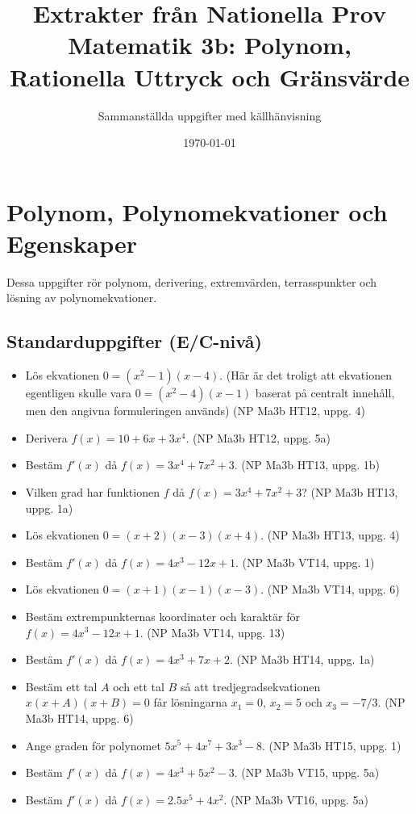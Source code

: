 \documentclass{article}
\title{Extrakter från Nationella Prov Matematik 3b: Polynom, Rationella Uttryck och Gränsvärde}
\author{Sammanställda uppgifter med källhänvisning}
\date{\today}
\begin{document}
\maketitle

\section{Polynom, Polynomekvationer och Egenskaper}

Dessa uppgifter rör polynom, derivering, extremvärden, terrasspunkter och lösning av polynomekvationer.

\subsection{Standarduppgifter (E/C-nivå)}
\begin{itemize}
    \item Lös ekvationen $0 = (x^2-1)(x-4)$. (Här är det troligt att ekvationen egentligen skulle vara $0 = (x^2-4)(x-1)$ baserat på centralt innehåll, men den angivna formuleringen används) (NP Ma3b HT12, uppg. 4)
    \item Derivera $f(x) = 10+6x+3x^4$. (NP Ma3b HT12, uppg. 5a)
    \item Bestäm $f'(x)$ då $f(x) = 3x^4 + 7x^2 + 3$. (NP Ma3b HT13, uppg. 1b)
    \item Vilken grad har funktionen $f$ då $f(x) = 3x^4 + 7x^2 + 3$? (NP Ma3b HT13, uppg. 1a)
    \item Lös ekvationen $0 = (x+2)(x-3)(x+4)$. (NP Ma3b HT13, uppg. 4)
    \item Bestäm $f'(x)$ då $f(x) = 4x^3 - 12x + 1$. (NP Ma3b VT14, uppg. 1)
    \item Lös ekvationen $0 = (x+1)(x-1)(x-3)$. (NP Ma3b VT14, uppg. 6)
    \item Bestäm extrempunkternas koordinater och karaktär för $f(x) = 4x^3 - 12x + 1$. (NP Ma3b VT14, uppg. 13)
    \item Bestäm $f'(x)$ då $f(x) = 4x^3 + 7x + 2$. (NP Ma3b HT14, uppg. 1a)
    \item Bestäm ett tal $A$ och ett tal $B$ så att tredjegradsekvationen $x(x+A)(x+B)=0$ får lösningarna $x_1=0$, $x_2=5$ och $x_3 = -7/3$. (NP Ma3b HT14, uppg. 6)
    \item Ange graden för polynomet $5x^5 + 4x^7 + 3x^3 - 8$. (NP Ma3b HT15, uppg. 1)
    \item Bestäm $f'(x)$ då $f(x) = 4x^3 + 5x^2 - 3$. (NP Ma3b VT15, uppg. 5a)
    \item Bestäm $f'(x)$ då $f(x) = 2.5x^5 + 4x^2$. (NP Ma3b VT16, uppg. 5a)

\end{itemize}
\end{document}
